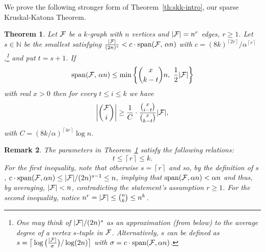 \documentclass[11pt]{article}
\newtheorem{theo}{Theorem}[section]
\newtheorem{remark}[theo]{Remark}
\newcommand{\FF}{{\cal F}}
\newcommand{\ceil}[1]{\left\lceil #1 \right\rceil}
\renewcommand{\wp}{\mathrm{span}}
\renewcommand{\a}{\alpha}
\newcommand{\g}{\gamma}
\newcommand{\N}{\mathbb{N}}
\begin{document}
We prove the following stronger form of Theorem~\ref{th:skk-intro}, our sparse Kruskal-Katona Theorem.

\begin{theo}\label{th:skk}
	Let $\FF$ be a $k$-graph with $n$ vertices and $|\FF|=n^r$ edges, $r \ge 1$. Let $s \in \N$ be the smallest satisfying $\frac{|\FF|}{(2n)^s} < c \cdot \wp(\FF,\, \a n)$ with 
	$c=(8k)^{\ceil{2r}}/\a^{\ceil{r}}$
	,\footnote{One may think of $|\FF|/(2n)^s$ as an approximation (from below) to the average degree of a vertex $s$-tuple in $\FF$. Alternatively, $s$ can be defined as $s=\big\lceil\log\big(\frac{|\FF|}{\sigma}\big)/\log(2n)\big\rceil$ with $\sigma=c \cdot \wp(\FF,\a n)$. 
	} 
	and put $t=s+1$.
	If 
	$$\wp(\FF,\,\a n) \le \min\bigg\{\binom{x}{k-t}n, \,\, \frac{1}{2}|\FF|\bigg\}$$
	with real $x>0$ then for every $t \le i \le k$ we  have 
	$$\bigg|\binom{\FF}{i}\bigg| \ge \frac{1}{C}\cdot \frac{\binom{x}{i-t}}{\binom{x}{k-t}}|\FF|,$$
	with $C = (8k/\a)^{\ceil{4r}} \log n$.
\end{theo}

\begin{remark}
	The parameters in Theorem~\ref{th:skk} satisfy the following relations:
	\begin{equation}\label{eq:sKK-relations}
		t \le \ceil{r} \le k.
	\end{equation}
	For the first inequality, note that otherwise $s=\ceil{r}$ and so, by the definition of $s$, $c \cdot \wp(\FF,\a n) \le |\FF|/(2n)^{s-1} \le n$, implying that $\wp(\FF,\a n) < \a n$ and thus, by averaging, $|\FF| < n$, contradicting the statement's assumption $r \ge 1$. 
	For the second inequality, notice $n^r = |\FF| \le \binom{n}{k} \le n^k$.
\end{remark}
\end{document}
